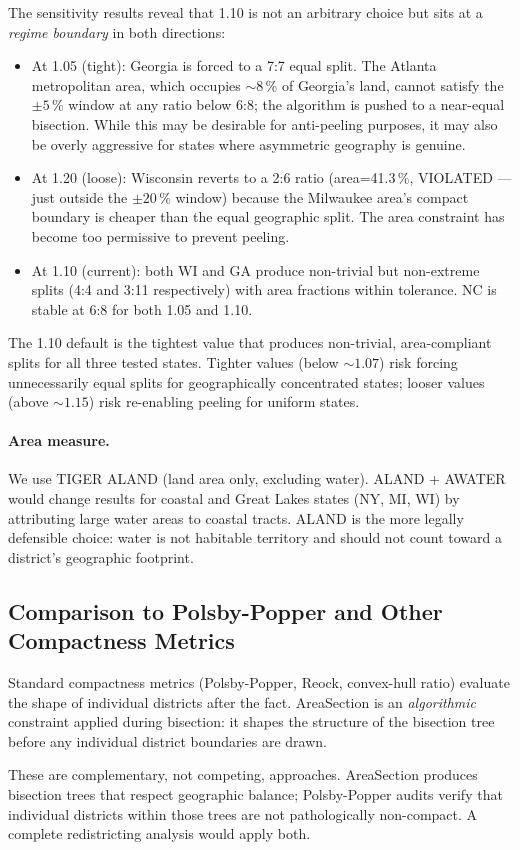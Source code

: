 The sensitivity results reveal that 1.10 is not an arbitrary choice but sits
at a \emph{regime boundary} in both directions:

\begin{itemize}
\item At 1.05 (tight): Georgia is forced to a 7:7 equal split.
  The Atlanta metropolitan area, which occupies $\sim$8\,\% of Georgia's land,
  cannot satisfy the $\pm 5\,\%$ window at any ratio below 6:8; the algorithm
  is pushed to a near-equal bisection.
  While this may be desirable for anti-peeling purposes, it may also be
  overly aggressive for states where asymmetric geography is genuine.

\item At 1.20 (loose): Wisconsin reverts to a 2:6 ratio
  (area=41.3\,\%, VIOLATED — just outside the $\pm 20\,\%$ window) because the
  Milwaukee area's compact boundary is cheaper than the equal geographic split.
  The area constraint has become too permissive to prevent peeling.

\item At 1.10 (current): both WI and GA produce non-trivial but non-extreme splits
  (4:4 and 3:11 respectively) with area fractions within tolerance.
  NC is stable at 6:8 for both 1.05 and 1.10.
\end{itemize}

The 1.10 default is the tightest value that produces non-trivial, area-compliant
splits for all three tested states.
Tighter values (below $\sim 1.07$) risk forcing unnecessarily equal splits for
geographically concentrated states; looser values (above $\sim 1.15$) risk
re-enabling peeling for uniform states.

\paragraph{Area measure.}
We use TIGER ALAND (land area only, excluding water).
ALAND + AWATER would change results for coastal and Great Lakes states
(NY, MI, WI) by attributing large water areas to coastal tracts.
ALAND is the more legally defensible choice: water is not habitable territory
and should not count toward a district's geographic footprint.

\subsection{Comparison to Polsby-Popper and Other Compactness Metrics}

Standard compactness metrics (Polsby-Popper, Reock, convex-hull ratio) evaluate
the shape of individual districts after the fact.
AreaSection is an \emph{algorithmic} constraint applied during bisection:
it shapes the structure of the bisection tree before any individual district
boundaries are drawn.

These are complementary, not competing, approaches.
AreaSection produces bisection trees that respect geographic balance;
Polsby-Popper audits verify that individual districts within those trees
are not pathologically non-compact.
A complete redistricting analysis would apply both.
